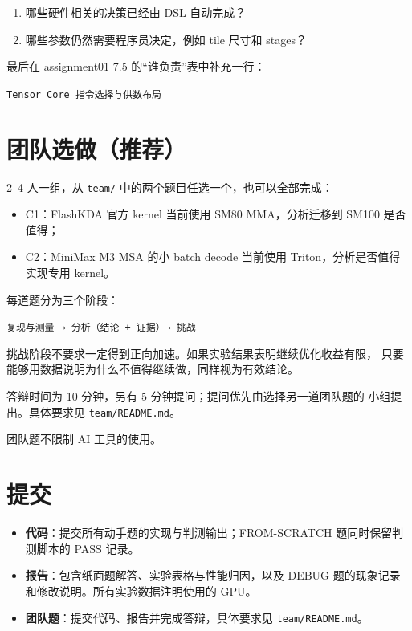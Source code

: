 \documentclass[11pt,a4paper,fontset=fandol]{ctexart}
\providecommand{\tightlist}{\setlength{\itemsep}{0pt}\setlength{\parskip}{0pt}}
\begin{document}
\begin{enumerate}
\def\labelenumi{(\alph{enumi})}
\item
  哪些硬件相关的决策已经由 DSL 自动完成？
\item
  哪些参数仍然需要程序员决定，例如 tile 尺寸和 stages？
\end{enumerate}

最后在 assignment01 7.5 的``谁负责''表中补充一行：

\texttt{Tensor\ Core\ 指令选择与供数布局}

\section*{团队选做（推荐）}\label{ux56e2ux961fux9009ux505aux63a8ux8350}

2--4 人一组，从 \texttt{team/} 中的两个题目任选一个，也可以全部完成：

\begin{itemize}
\tightlist
\item
  C1：FlashKDA 官方 kernel 当前使用 SM80 MMA，分析迁移到 SM100
  是否值得；
\item
  C2：MiniMax M3 MSA 的小 batch decode 当前使用
  Triton，分析是否值得实现专用 kernel。
\end{itemize}

每道题分为三个阶段：

\texttt{复现与测量\ →\ 分析（结论\ +\ 证据）→\ 挑战}

挑战阶段不要求一定得到正向加速。如果实验结果表明继续优化收益有限，
只要能够用数据说明为什么不值得继续做，同样视为有效结论。

答辩时间为 10 分钟，另有 5 分钟提问；提问优先由选择另一道团队题的
小组提出。具体要求见 \texttt{team/README.md}。

团队题不限制 AI 工具的使用。

\section*{提交}\label{ux63d0ux4ea4}

\begin{itemize}
\tightlist
\item
  \textbf{代码}：提交所有动手题的实现与判测输出；FROM-SCRATCH
  题同时保留判测脚本的 PASS 记录。
\item
  \textbf{报告}：包含纸面题解答、实验表格与性能归因，以及 DEBUG
  题的现象记录和修改说明。所有实验数据注明使用的 GPU。
\item
  \textbf{团队题}：提交代码、报告并完成答辩，具体要求见
  \texttt{team/README.md}。
\end{itemize}
\end{document}
